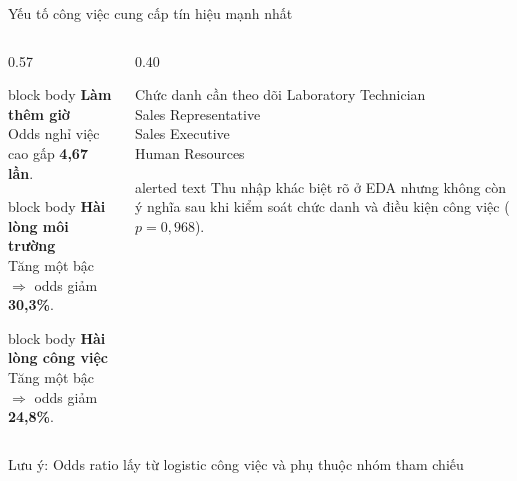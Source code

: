 \documentclass[10pt,aspectratio=169]{beamer}
\begin{document}
\begin{frame}{Yếu tố công việc cung cấp tín hiệu mạnh nhất}
  \begin{columns}[T,onlytextwidth]
    \begin{column}{0.57\textwidth}
      \begin{beamercolorbox}[sep=0.17cm,rounded=true]{block body}
        \textbf{\color{HCMUSRed}Làm thêm giờ}\\[-0.02cm]
        Odds nghỉ việc cao gấp \textbf{4,67 lần}.
      \end{beamercolorbox}
      \vspace{0.16cm}
      \begin{beamercolorbox}[sep=0.17cm,rounded=true]{block body}
        \textbf{\color{HCMUSGreen}Hài lòng môi trường}\\[-0.02cm]
        Tăng một bậc $\Rightarrow$ odds giảm \textbf{30,3\%}.
      \end{beamercolorbox}
      \vspace{0.16cm}
      \begin{beamercolorbox}[sep=0.17cm,rounded=true]{block body}
        \textbf{\color{HCMUSGreen}Hài lòng công việc}\\[-0.02cm]
        Tăng một bậc $\Rightarrow$ odds giảm \textbf{24,8\%}.
      \end{beamercolorbox}
    \end{column}
    \begin{column}{0.40\textwidth}
      \begin{block}{Chức danh cần theo dõi}
        \small
        Laboratory Technician\\
        Sales Representative\\
        Sales Executive\\
        Human Resources
      \end{block}
      \vspace{0.12cm}
      \begin{beamercolorbox}[sep=0.15cm,rounded=true]{alerted text}
        \small
        Thu nhập khác biệt rõ ở EDA nhưng không còn ý nghĩa sau khi
        kiểm soát chức danh và điều kiện công việc
        (\(p=0,968\)).
      \end{beamercolorbox}
    \end{column}
  \end{columns}
  \vspace{0.16cm}
  {\scriptsize\color{MutedText}
   Lưu ý: Odds ratio lấy từ logistic công việc và phụ thuộc nhóm tham chiếu}
\end{frame}
\end{document}
